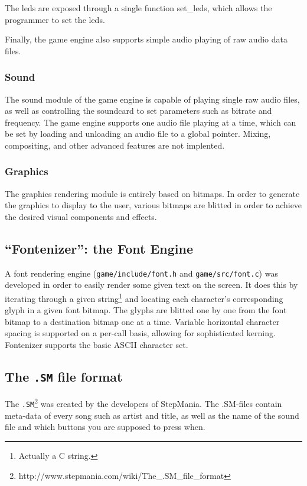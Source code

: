     The leds are exposed through a single function set_leds, which allows the programmer to set the leds.


    Finally, the game engine also supports simple audio playing of raw audio data files.


\subsubsection{Sound}
The sound module of the game engine is capable of playing single raw audio files, as well as controlling the soundcard to set parameters such as bitrate and frequency.
The game engine supports one audio file playing at a time, which can be set by loading and unloading an audio file to a global pointer.
Mixing, compositing, and other advanced features are not implented.

\subsubsection{Graphics}
The graphics rendering module is entirely based on bitmaps.
In order to generate the graphics to display to the user, various bitmaps are blitted in order to achieve the desired visual components and effects.


\subsection{``Fontenizer'': the Font Engine}
	A font rendering engine (\texttt{game/include/font.h} and \texttt{game/src/font.c}) was developed in order to easily render some given text on the screen.
	It does this by iterating through a given string\footnote{Actually a C string.} and locating each character's corresponding glyph in a given font bitmap.
	The glyphs are blitted one by one from the font bitmap to a destination bitmap one at a time.
    Variable horizontal character spacing is supported on a per-call basis, allowing for sophisticated kerning.
    Fontenizer supports the basic ASCII character set.
        
\subsection{The \texttt{.SM} file format}
The \texttt{.SM}\footnote{http://www.stepmania.com/wiki/The_.SM_file_format} was created by the developers of StepMania.
The .SM-files contain meta-data of every song such as artist and title, as well as the name of the sound file and which buttons you are supposed to press when.
